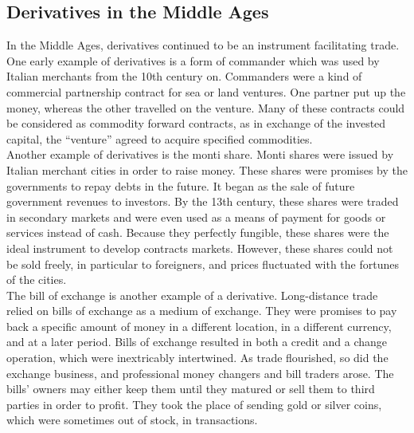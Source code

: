 \documentclass[a4 paper, 12pt]{report}
\theoremstyle{plain}
\begin{document}
\subsection{Derivatives in the Middle Ages}
\noindent
\par In the Middle Ages, derivatives continued to be an instrument facilitating trade.
One early example of derivatives is a form of commander which was used by Italian
merchants from the 10th century on. Commanders were a kind of commercial
partnership contract for sea or land ventures. One partner put up the money, whereas
the other travelled on the venture. Many of these contracts could be considered as
commodity forward contracts, as in exchange of the invested capital, the ``venture''
agreed to acquire specified commodities.\\
Another example of derivatives is the monti share. Monti shares were issued by Italian
merchant cities in order to raise money. These shares were promises by the governments
to repay debts in the future. It began as the sale of future government revenues to
investors. By the 13th century, these shares were traded in secondary markets and were
even used as a means of payment for goods or services instead of cash. Because they
perfectly fungible, these shares were the ideal instrument to develop contracts markets.
However, these shares could not be sold freely, in particular to foreigners, and prices
fluctuated with the fortunes of the cities.\\
The bill of exchange is another example of a derivative. Long-distance trade relied on bills
of exchange as a medium of exchange. They were promises to pay back a specific amount
of money in a different location, in a different currency, and at a later period. Bills of
exchange resulted in both a credit and a change operation, which were inextricably
intertwined. As trade flourished, so did the exchange business, and professional money
changers and bill traders arose. The bills' owners may either keep them until they
matured or sell them to third parties in order to profit. They took the place of sending
gold or silver coins, which were sometimes out of stock, in transactions.
\end{document}
